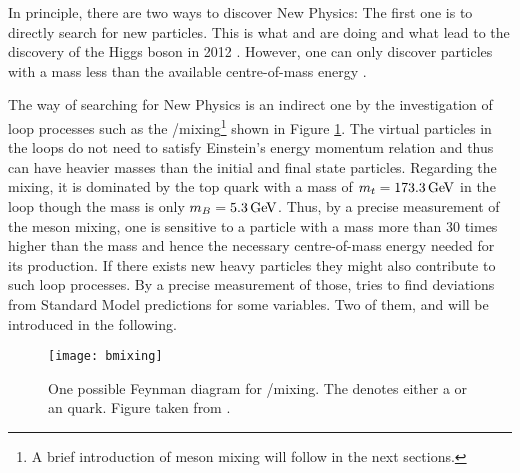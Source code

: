 In principle, there are two ways to discover New Physics:
The first one is to directly search for new particles.
This is what \atlas and \cms are doing and what lead to the discovery of the Higgs boson in 2012 \cite{Higgs_ATLAS, Higgs_CMS}.
However, one can only discover particles with a mass less than the available centre-of-mass energy \sqs.

The \lhcb way of searching for New Physics is an indirect one by the investigation of loop processes such as the \B/\Bbar mixing\footnote{A brief introduction of meson mixing will follow in the next sections.} shown in Figure \ref{fig:Bmixing}.
The virtual particles in the loops do not need to satisfy Einstein's energy momentum relation and thus can have heavier masses than the initial and final state particles.
Regarding the \B mixing, it is dominated by the top quark with a mass of $m_t = 173.3 \mathrm{\,Ge\kern -0.1em V}$ in the loop though the \B mass is only $m_{B} = 5.3\mathrm{\,Ge\kern -0.1em V}$.
Thus, by a precise measurement of the \B meson mixing, one is sensitive to a particle with a mass more than 30 times higher than the \B mass and hence the necessary centre-of-mass energy needed for its production.
If there exists new heavy particles they might also contribute to such loop processes.
By a precise measurement of those, \lhcb tries to find deviations from Standard Model predictions for some variables.
Two of them, \asld and \Vub will be introduced in the following.
\begin{figure}[tb]
    \centering
	\texttt{[image: bmixing]}	
	\caption{One possible Feynman diagram for \B/\Bbar mixing. The \quark denotes either a \dquark or an \squark quark. Figure taken from \cite{LHCb_roadmap}.}
	\label{fig:Bmixing}
\end{figure}

